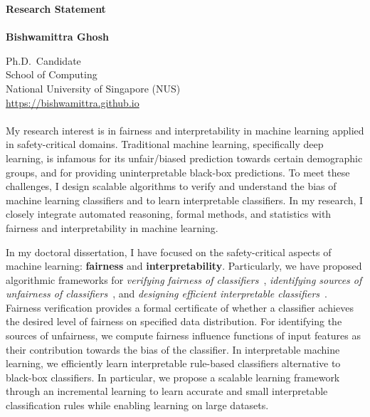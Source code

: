\documentclass{article}
\newcommand{\blue}[1]{\textcolor{blue}{#1}}
\begin{document}
	\noindent\huge \textbf{Research Statement} \\
	\vspace{0.1em}\\
	\Large \textbf{Bishwamittra Ghosh}
		
	\normalsize
	\noindent Ph.D.\ Candidate\\
	School of Computing\\
	National University of Singapore (NUS)\\
	\blue{\url{https://bishwamittra.github.io}}



	\paragraph{}
	My research interest is in fairness and interpretability in machine learning applied in safety-critical domains. Traditional machine learning, specifically deep learning, is infamous for its unfair/biased prediction towards certain demographic groups, and for providing uninterpretable black-box predictions. To meet these challenges, I design scalable algorithms to verify and understand the bias of machine learning classifiers and to learn interpretable classifiers. In my research, I closely integrate automated reasoning, formal methods, and statistics with fairness and interpretability in machine learning.
	
	
	
	In my doctoral dissertation, I have focused on the safety-critical aspects of machine learning: \textbf{fairness} and \textbf{interpretability}. Particularly, we have proposed algorithmic frameworks for \emph{verifying fairness of classifiers}~\cite{ghosh2021justicia,ghosh2022algorithmic}, \emph{identifying sources of unfairness of classifiers}~\cite{ghosh2022how}, and \emph{designing efficient interpretable classifiers}~\cite{ghosh22efficient,ghosh2019incremental,ghosh2020classification}. Fairness verification provides a formal certificate of whether a classifier achieves the desired level of fairness on specified data distribution. For identifying the sources of unfairness, we compute fairness influence functions of input features as their contribution towards the bias of the classifier. In interpretable machine learning, we efficiently learn interpretable rule-based classifiers alternative to black-box classifiers. In particular, we propose a scalable learning framework through an incremental learning to learn accurate and small interpretable classification rules while enabling learning on large datasets.
	
\end{document}
